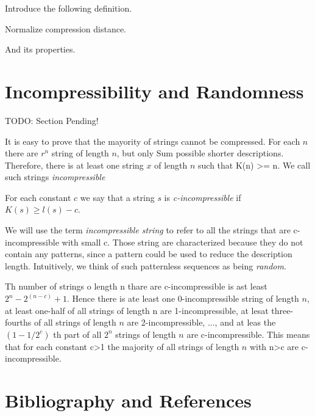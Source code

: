 {\color{red} Introduce the following definition.}

\begin{definition}
Normalize compression distance.
\end{definition}

{\color{red} And its properties.}


%
%

\section{Incompressibility and Randomness}
\label{sec:incompressibility_randomness}

{\color{red} TODO: Section Pending!}

It is easy to prove that the mayority of strings cannot be compressed. For each $n$ there are $r^n$ string of length $n$, but only Sum possible shorter descriptions. Therefore, there is at least one string $x$ of length $n$ such that K(n) >= n. We call such strings \emph{incompressible}

\begin{definition}
For each constant $c$ we say that a string $s$ is \emph{c-incompressible} if $K(s)\geq l(s)-c$.
\end{definition}

We will use the term \emph{incompressible string} to refer to all the strings that are c-incompressible with small c. Those string are characterized because they do not contain any patterns, since a pattern could be used to reduce the description length. Intuitively, we think of such patternless sequences as being \emph{random}.

Th number of strings o length n thare are c-incompressible is ast least $2^n - 2^(n-c) + 1$. Hence there is ate least one 0-incompressible string of length $n$, at least one-half of all strings of length n are 1-incompressible, at lesat three-fourths of all strings of length $n$ are 2-incompressible, ..., and at leas the $(1-1/2^c)$ th part of all $2^n$ strings of length $n$ are c-incompressible. This means that for each constant c>1 the majority of all strings of length $n$ with n>c are c-incompressible.


%
%

\section*{Bibliography and References}

